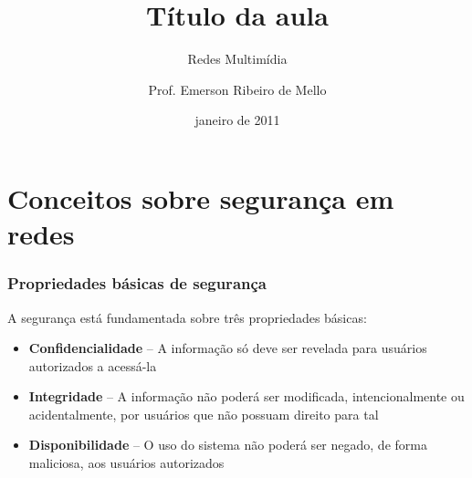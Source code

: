 \documentclass{beamer}
\title{Título da aula}
\subtitle{Redes Multimídia}
\author[Prof. Emerson Mello]{Prof. Emerson Ribeiro de Mello}
\institute[IFSC]{
Instituto Federal de Santa Catarina -- IFSC\\
campus São José \\
\url{mello@ifsc.edu.br}
}
\date{janeiro de 2011}
\begin{document}
\begin{frame}
	\maketitle
\end{frame}



\section{Conceitos sobre segurança em redes}

\begin{frame}
	\frametitle{Propriedades básicas de segurança}
	A segurança está fundamentada sobre três propriedades básicas:\\
	\begin{itemize}
		\item \textbf{Confidencialidade} -- A informação só deve ser revelada para usuários autorizados a acessá-la
		\item \textbf{Integridade} -- A informação não poderá ser modificada, intencionalmente ou acidentalmente, por usuários que não possuam direito para tal
		\item \textbf{Disponibilidade} -- O uso do sistema não poderá ser negado, de forma maliciosa, aos usuários autorizados
	\end{itemize} 
\end{frame}

\end{document}
